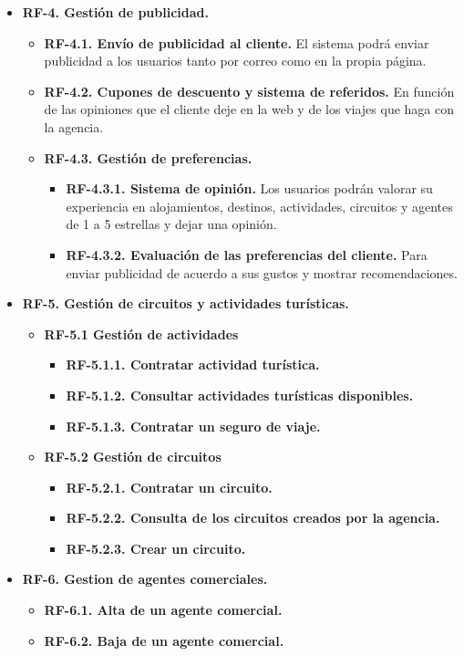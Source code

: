 \documentclass{article}
\begin{document}
\begin{itemize}
		\item \textbf{RF-4. Gestión de publicidad.}
		\begin{itemize}
			\item {\bf RF-4.1. Envío de publicidad al cliente.} El sistema podrá enviar publicidad a los usuarios tanto por correo como en la propia página.
			\item {\bf RF-4.2. Cupones de descuento y sistema de referidos.} En función de las opiniones que el cliente deje en la web y de los viajes que haga con la agencia.
			\item \textbf{RF-4.3. Gestión de preferencias.}
			\begin{itemize}
				\item \textbf{RF-4.3.1. Sistema de opinión.} Los usuarios podrán valorar su experiencia en alojamientos, destinos, actividades, circuitos y agentes de 1 a 5 estrellas y dejar una opinión.
				\item \textbf{RF-4.3.2. Evaluación de las preferencias del cliente.} Para enviar publicidad de acuerdo a sus gustos y mostrar recomendaciones.
			\end{itemize}
		\end{itemize}
	
		\item \textbf{RF-5. Gestión de circuitos y actividades turísticas.}
		\begin{itemize}
			\item \textbf{RF-5.1 Gestión de actividades}
			\begin{itemize}
				\item \textbf{RF-5.1.1. Contratar actividad turística.}
				\item \textbf{RF-5.1.2. Consultar actividades turísticas disponibles.}
				\item \textbf{RF-5.1.3. Contratar un seguro de viaje.}
			\end{itemize}
			\item \textbf{RF-5.2 Gestión de circuitos}
			\begin{itemize}
				\item \textbf{RF-5.2.1. Contratar un circuito.}
				\item \textbf{RF-5.2.2. Consulta de los circuitos creados por la agencia.}
				\item \textbf{RF-5.2.3. Crear un circuito.}
			\end{itemize}
		\end{itemize}
		
		\item \textbf{RF-6. Gestion de agentes comerciales.}
		\begin{itemize}
			\item \textbf{RF-6.1. Alta de un agente comercial.}
			\item \textbf{RF-6.2. Baja de un agente comercial.}
		\end{itemize}
		

\end{itemize}
\end{document}
